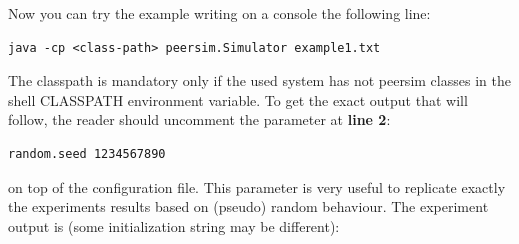 \documentclass[a4paper,11pt]{article}
\begin{document}
Now you can try the example writing on a console the following line:

\begin{verbatim}
java -cp <class-path> peersim.Simulator example1.txt
\end{verbatim}

The classpath is mandatory only if the used system has not peersim
classes in the shell CLASSPATH environment variable. To get the exact
output that will follow, the reader should uncomment the parameter
at \textbf{line 2}:

\begin{verbatim}
random.seed 1234567890
\end{verbatim}

on top of the configuration file. This parameter is very useful to
replicate exactly the experiments results based on (pseudo) random
behaviour. The experiment output is (some initialization string may
be different):\\
\end{document}
